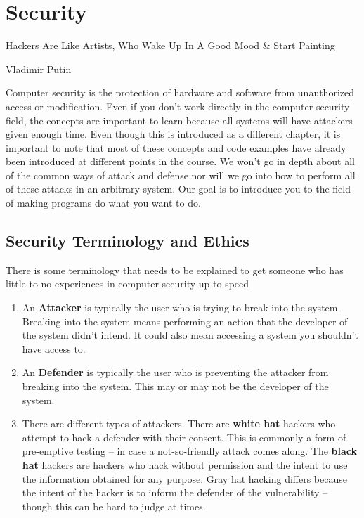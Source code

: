 \chapter{Security}

\epigraph{Hackers Are Like Artists, Who Wake Up In A Good Mood \& Start Painting}{Vladimir Putin}

Computer security is the protection of hardware and software from unauthorized access or modification.
Even if you don't work directly in the computer security field, the concepts are important to learn because all systems will have attackers given enough time.
Even though this is introduced as a different chapter, it is important to note that most of these concepts and code examples have already been introduced at different points in the course.
We won't go in depth about all of the common ways of attack and defense nor will we go into how to perform all of these attacks in an arbitrary system.
Our goal is to introduce you to the field of making programs do what you want to do.

\section{Security Terminology and Ethics}

There is some terminology that needs to be explained to get someone who has little to no experiences in computer security up to speed

\begin{enumerate}
\item An \textbf{Attacker} is typically the user who is trying to break into the system. Breaking into the system means performing an action that the developer of the system didn't intend. It could also mean accessing a system you shouldn't have access to.
\item An \textbf{Defender} is typically the user who is preventing the attacker from breaking into the system. This may or may not be the developer of the system.
\item There are different types of attackers. There are \textbf{white hat} hackers who attempt to hack a defender with their consent. This is commonly a form of pre-emptive testing -- in case a not-so-friendly attack comes along. The \textbf{black hat} hackers are hackers who hack without permission and the intent to use the information obtained for any purpose. Gray hat hacking differs because the intent of the hacker is to inform the defender of the vulnerability -- though this can be hard to judge at times.
\end{enumerate}

